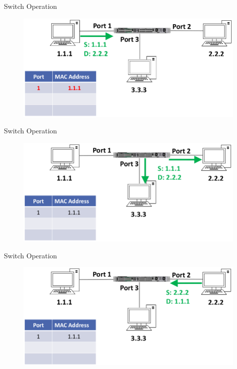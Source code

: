 \documentclass[pdflatex,compress,mathserif]{beamer}
\begin{document}
\begin{frame}{Switch Operation}
	\begin{figure}
		\centering
		\includegraphics[width=\linewidth]{img/img06}
	\end{figure}
\end{frame}

\begin{frame}{Switch Operation}
	\begin{figure}
		\centering
		\includegraphics[width=\linewidth]{img/img07}
	\end{figure}
\end{frame}

\begin{frame}{Switch Operation}
	\begin{figure}
		\centering
		\includegraphics[width=\linewidth]{img/img08}
	\end{figure}
\end{frame}
\end{document}
